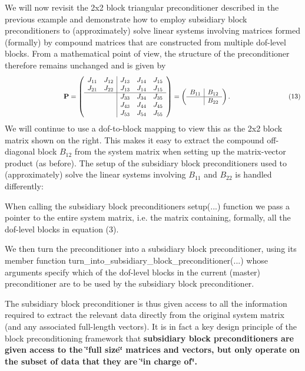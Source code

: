 We will now revisit the 2x2 block triangular preconditioner described in the previous example and demonstrate how to employ subsidiary block preconditioners to (approximately) solve linear systems involving matrices formed (formally) by compound matrices that are constructed from multiple dof-\/level blocks. From a mathematical point of view, the structure of the preconditioner therefore remains unchanged and is given by \[ \hspace{3cm} {\bf P} = \left( \begin{array}{cc|ccc} J_{11} & J_{12} & J_{13} & J_{14} & J_{15} \\ J_{21} & J_{22} & J_{13} & J_{14} & J_{15} \\ \hline & & J_{33} & J_{34} & J_{35} \\ & & J_{43} & J_{44} & J_{45} \\ & & J_{53} & J_{54} & J_{55} \\ \end{array} \right)= \left( \begin{array}{c|c} B_{11} & B_{12}\\ \hline & B_{22} \\ \end{array} \right). \hspace{3cm} (13) \] We will continue to use a dof-\/to-\/block mapping to view this as the 2x2 block matrix shown on the right. This makes it easy to extract the compound off-\/diagonal block $ B_{12} $ from the system matrix when setting up the matrix-\/vector product (as before). The setup of the subsidiary block preconditioners used to (approximately) solve the linear systems involving $ B_{11} $ and $ B_{22}$ is handled differently\+:
\begin{DoxyItemize}
\item When calling the subsidiary block preconditioner\textquotesingle{}s {\ttfamily setup}(...) function we pass a pointer to the entire system matrix, i.\+e. the matrix containing, formally, all the dof-\/level blocks in equation (3).
\end{DoxyItemize}
\begin{DoxyItemize}
\item We then turn the preconditioner into a subsidiary block preconditioner, using its member function {\ttfamily turn\+\_\+into\+\_\+subsidiary\+\_\+block\+\_\+preconditioner}(...) whose arguments specify which of the dof-\/level blocks in the current (master) preconditioner are to be used by the subsidiary block preconditioner.
\end{DoxyItemize}The subsidiary block preconditioner is thus given access to all the information required to extract the relevant data directly from the original system matrix (and any associated full-\/length vectors). It is in fact a key design principle of the block preconditioning framework that {\bfseries subsidiary block preconditioners are given access to the \char`\"{}full size\char`\"{} matrices and vectors, but only operate on the subset of data that they are \char`\"{}in charge of\char`\"{}.}

